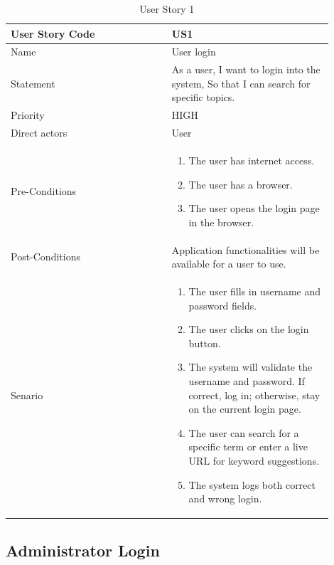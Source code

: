 \documentclass{scrartcl}
\begin{document}
\begin{table}[H]
  \caption{User Story 1}
  \begin{tabular}{p{0.45\linewidth} | p{0.45\linewidth}}
    \toprule
    User Story Code & US1 \\
    \midrule
    Name & User login \\
    \hline
    Statement & As a user, I want to login into the system, So that I can search for specific topics. \\
    \hline
    Priority & HIGH \\
    \hline
    Direct actors & User \\
    \hline
    Pre-Conditions & {
                     \begin{enumerate}
                     \item The user has internet access.
                     \item The user has a browser.
                     \item The user opens the login page in the browser.
                     \end{enumerate}
                     } \\
    \hline
    Post-Conditions & Application functionalities will be available for a user to use. \\
    \hline
    Senario & {
              \begin{enumerate}
              \item The user fills in username and password fields.
              \item The user clicks on the login button.
              \item The system will validate the username and password. If correct, log in; otherwise, stay on the current login page.
              \item The user can search for a specific term or enter a live URL for keyword suggestions.
              \item The system logs both correct and wrong login.
              \end{enumerate}
              } \\
    \bottomrule
  \end{tabular}
\end{table}

\subsection{Administrator Login}
\end{document}
